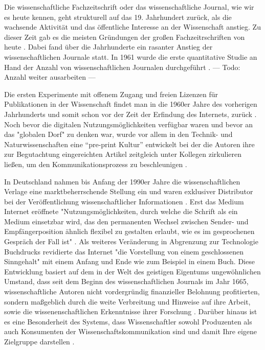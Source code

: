 Die wissenschaftliche Fachzeitschrift oder das wissenschaftliche Journal, wie wir es heute kennen, geht strukturell auf das 19. Jahrhundert zurück, als die wachsende Aktivität und das öffentliche Interesse an der Wissenschaft anstieg. Zu dieser Zeit gab es die meisten Gründungen der großen Fachzeitrschriften von heute \cite{porter_1964_scientific}. Dabei fand über die Jahrhunderte ein rasanter Anstieg der wissenschaftlichen Journale statt. In 1961 wurde die erste quantitative Studie an Hand der Anzahl von wissenschaftlichen Journalen durchgeführt \cite{de_1982_little}. --- Todo: Anzahl weiter ausarbeiten ---

Die ersten Experimente mit offenem Zugang und freien Lizenzen für Publikationen in der Wissenschaft findet man in die 1960er Jahre des vorherigen Jahrhunderts und somit schon vor der Zeit der Erfindung des Internets, zurück \cite{cite:18b}. Noch bevor die digitalen Nutzungsmöglichkeiten verfügbar waren und bevor an das "globalen Dorf"\cite{mcluhan_1962_gutenberg} zu denken war, wurde vor allem in den Technik- und Naturwissenschaften eine “pre-print Kultur” entwickelt bei der die Autoren ihre zur Begutachtung eingereichten Artikel zeitgleich unter Kollegen zirkulieren ließen, um den Kommunikationsprozess zu beschleunigen \cite{suchen-Hoffmann-Zugang-undVerwertung-öffentlicher-Informationen}.

In Deutschland nahmen bis Anfang der 1990er Jahre die wissenschaftlichen Verlage eine marktbeherrschende Stellung ein und waren exklusiver Distributor bei der Veröffentlichung wissenschaftlicher Informationen \cite{schloegl_2005} \cite{offhaus_2012_institutionelle_repos}. Erst das Medium Internet eröffnete "Nutzungsmöglichkeiten, durch welche die Schrift als ein Medium einsetzbar wird, das den permanenten Wechsel zwischen Sender- und Empfängerposition ähnlich flexibel zu gestalten erlaubt, wie es im gesprochenen Gespräch der Fall ist" \cite{sandbothe_2000_pragmatische}. Als weiteres Veränderung in Abgrenzung zur Technologie Buchdrucks revidierte das Internet "die Vorstellung von einem geschlossenen Sinngehalt" \cite{sandbothe_2000_pragmatische} mit einem Anfang und Ende wie zum Beispiel in einem Buch. Diese Entwicklung basiert auf dem in der Welt des geistigen Eigentums ungewöhnlichen Umstand, dass seit dem Beginn des wissenschaftlichen Journals im Jahr 1665, wissenschaftliche Autoren nicht vordergründig finanzieller Belohnung profitierten, sondern maßgeblich durch die weite Verbreitung und Hinweise auf ihre Arbeit, sowie die wissenenschaftlichen Erkenntnisse ihrer Forschung \cite{albert_2006_open_implications}. Darüber hinaus ist es eine Besonderheit des Systems, dass Wissenschaftler sowohl Produzenten als auch Konsumenten der Wissenschaftskommunikation sind und damit Ihre eigene Zielgruppe darstellen \cite{Hess_2006}.

